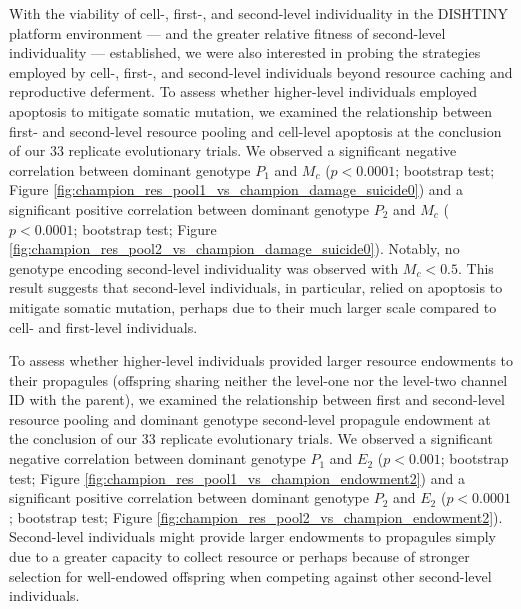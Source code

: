 With the viability of cell-, first-, and second-level individuality in the DISHTINY platform environment --- and the greater relative fitness of second-level individuality --- established, we were also interested in probing the strategies employed by cell-, first-, and second-level individuals beyond resource caching and reproductive deferment.
To assess whether higher-level individuals employed apoptosis to mitigate somatic mutation, we examined the relationship between first- and second-level resource pooling and cell-level apoptosis at the conclusion of our 33 replicate evolutionary trials.
We observed a significant negative correlation between dominant genotype $P_1$ and $M_{c}$ ($p < 0.0001$; bootstrap test; Figure \ref{fig:champion_res_pool1_vs_champion_damage_suicide0}) and a significant positive correlation between dominant genotype $P_2$ and $M_{c}$ ($p < 0.0001$; bootstrap test; Figure \ref{fig:champion_res_pool2_vs_champion_damage_suicide0}).
Notably, no genotype encoding second-level individuality was observed with $M_{c} < 0.5$.
This result suggests that second-level individuals, in particular, relied on apoptosis to mitigate somatic mutation, perhaps due to their much larger scale compared to cell- and first-level individuals.

To assess whether higher-level individuals provided larger resource endowments to their propagules (offspring sharing neither the level-one nor the level-two channel ID with the parent), we examined the relationship between first and second-level resource pooling and dominant genotype second-level propagule endowment at the conclusion of our 33 replicate evolutionary trials.
We observed a significant negative correlation between dominant genotype $P_1$ and $E_2$ ($p < 0.001$; bootstrap test; Figure \ref{fig:champion_res_pool1_vs_champion_endowment2}) and a significant positive correlation between dominant genotype $P_2$ and $E_2$ ($p <  0.0001$; bootstrap test; Figure \ref{fig:champion_res_pool2_vs_champion_endowment2}).
Second-level individuals might provide larger endowments to propagules simply due to a greater capacity to collect resource or perhaps because of stronger selection for well-endowed offspring when competing against other second-level individuals.
